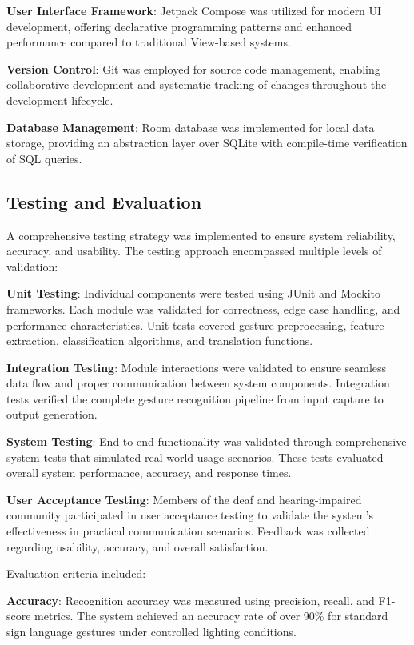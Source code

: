 \documentclass[12pt]{article}
\begin{document}
\textbf{User Interface Framework}: Jetpack Compose was utilized for modern UI development, offering declarative programming patterns and enhanced performance compared to traditional View-based systems.

\textbf{Version Control}: Git was employed for source code management, enabling collaborative development and systematic tracking of changes throughout the development lifecycle.

\textbf{Database Management}: Room database was implemented for local data storage, providing an abstraction layer over SQLite with compile-time verification of SQL queries.

\subsection{Testing and Evaluation}

A comprehensive testing strategy was implemented to ensure system reliability, accuracy, and usability. The testing approach encompassed multiple levels of validation:

\textbf{Unit Testing}: Individual components were tested using JUnit and Mockito frameworks. Each module was validated for correctness, edge case handling, and performance characteristics. Unit tests covered gesture preprocessing, feature extraction, classification algorithms, and translation functions.

\textbf{Integration Testing}: Module interactions were validated to ensure seamless data flow and proper communication between system components. Integration tests verified the complete gesture recognition pipeline from input capture to output generation.

\textbf{System Testing}: End-to-end functionality was validated through comprehensive system tests that simulated real-world usage scenarios. These tests evaluated overall system performance, accuracy, and response times.

\textbf{User Acceptance Testing}: Members of the deaf and hearing-impaired community participated in user acceptance testing to validate the system's effectiveness in practical communication scenarios. Feedback was collected regarding usability, accuracy, and overall satisfaction.

Evaluation criteria included:

\textbf{Accuracy}: Recognition accuracy was measured using precision, recall, and F1-score metrics. The system achieved an accuracy rate of over 90\% for standard sign language gestures under controlled lighting conditions.
\end{document}
